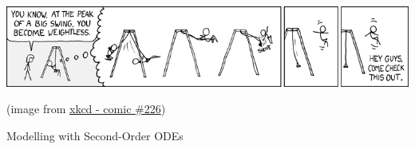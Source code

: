%
%


\begin{topic}



\vfil

\begin{center}
\begin{minipage}{500pt}
	\includegraphics*[width=500pt]{images/chap4-xkcd.png}

	\hfill {\footnotesize (image from \href{https://www.xkcd.com/226/}{xkcd - comic \#226})}
\end{minipage}
\end{center}


\end{topic}












%
%



\begin{module}{Modelling with Second-Order ODEs}
	\label{2nd:model}

	
	
\end{module}



